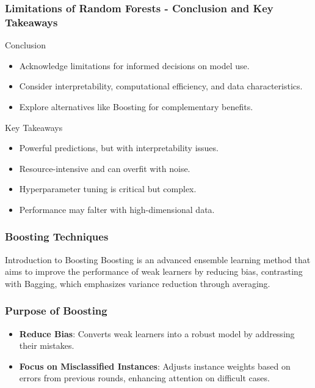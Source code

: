 \documentclass[aspectratio=169]{beamer}
\begin{document}
\begin{frame}[fragile]
  \frametitle{Limitations of Random Forests - Conclusion and Key Takeaways}
  \begin{block}{Conclusion}
    \begin{itemize}
      \item Acknowledge limitations for informed decisions on model use.
      \item Consider interpretability, computational efficiency, and data characteristics.
      \item Explore alternatives like Boosting for complementary benefits.
    \end{itemize}
  \end{block}

  \begin{block}{Key Takeaways}
    \begin{itemize}
      \item Powerful predictions, but with interpretability issues.
      \item Resource-intensive and can overfit with noise.
      \item Hyperparameter tuning is critical but complex.
      \item Performance may falter with high-dimensional data.
    \end{itemize}
  \end{block}
\end{frame}

\begin{frame}[fragile]
  \frametitle{Boosting Techniques}

  \begin{block}{Introduction to Boosting}
    Boosting is an advanced ensemble learning method that aims to improve the performance of weak learners by reducing bias, contrasting with Bagging, which emphasizes variance reduction through averaging.
  \end{block}
\end{frame}

\begin{frame}[fragile]
  \frametitle{Purpose of Boosting}

  \begin{itemize}
    \item \textbf{Reduce Bias}: Converts weak learners into a robust model by addressing their mistakes.
    \item \textbf{Focus on Misclassified Instances}: Adjusts instance weights based on errors from previous rounds, enhancing attention on difficult cases.
  \end{itemize}
\end{frame}
\end{document}
